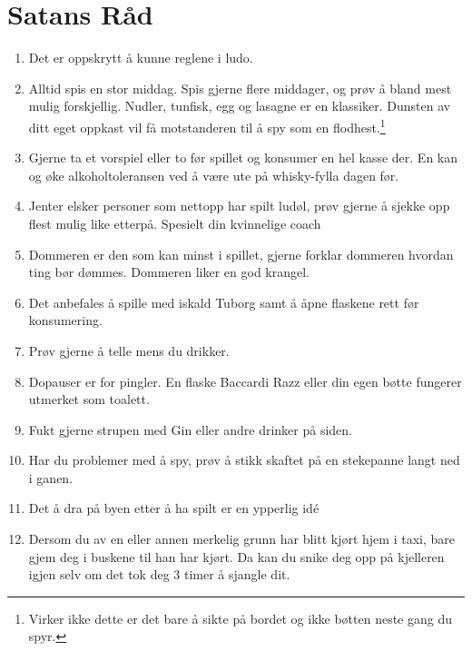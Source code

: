 \documentclass[10pt,a4paper,norsk,openany]{book}
\begin{document}
\section{Satans Råd}

\begin{enumerate}
	\item Det er oppskrytt å kunne reglene i ludo.
    
	\item Alltid spis en stor middag. Spis gjerne flere middager, og prøv å bland
    mest mulig forskjellig. Nudler, tunfisk, egg og lasagne er en klassiker. Dunsten av
    ditt eget oppkast vil få motstanderen til å spy som en
    flodhest.$\!$\footnote{Virker ikke dette er det bare å sikte på bordet og ikke
    bøtten neste gang du spyr.}
    
  \item Gjerne ta et vorspiel eller to før spillet og konsumer en hel kasse
    der. En kan og øke alkoholtoleransen ved å være ute på whisky-fylla dagen før.
    
  \item Jenter elsker personer som nettopp har spilt ludøl, prøv gjerne å
    sjekke opp flest mulig like etterpå. Spesielt din kvinnelige coach 
    
  \item Dommeren er den som kan minst i spillet, gjerne forklar dommeren
    hvordan ting bør dømmes. Dommeren liker en god krangel.
    
  \item Det anbefales å spille med iskald Tuborg samt å åpne flaskene rett før
    konsumering.
    
  \item Prøv gjerne å telle mens du drikker. 
    
  \item Dopauser er for pingler. En flaske Baccardi Razz eller din egen bøtte
    fungerer utmerket som toalett.
    
  \item Fukt gjerne strupen med Gin eller andre drinker på siden.
    
  \item Har du problemer med å spy, prøv å stikk skaftet på en stekepanne langt ned i ganen.

  \item Det å dra på byen etter å ha spilt er en ypperlig idé

  \item Dersom du av en eller annen merkelig grunn har blitt kjørt hjem i taxi,
    bare gjem deg i buskene til han har kjørt. Da kan du snike deg opp på
    kjelleren igjen selv om det tok deg 3 timer å sjangle dit.
\end{enumerate}
\end{document}
